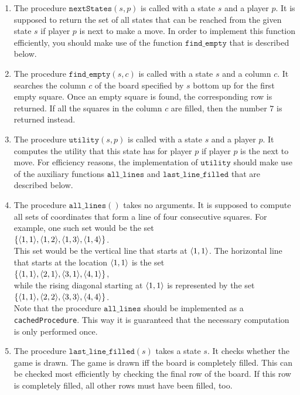 \begin{enumerate}
\item The procedure $\texttt{nextStates}(s, p)$ is called with a state $s$ and a player $p$.
      It is supposed to return the set of all states that can be reached from the given state $s$ if player $p$
      is next to make a move.  In order to implement this function efficiently, you should make use of the
      function $\texttt{find\_empty}$ that is described below.  
\item The procedure $\texttt{find\_empty}(s, c)$ is called with a state $s$ and a column $c$.  It searches the
      column $c$ of the board specified by $s$ bottom up for the first empty square.  Once an empty square is found, 
      the corresponding row is returned.  If all the squares in the column $c$ are filled, then the number $7$
      is returned instead.
\item The procedure $\texttt{utility}(s, p)$ is called with a state $s$ and a player $p$.
      It computes the utility that this state has for player $p$ if player $p$ is the next to move.
      For efficiency reasons, the implementation of $\texttt{utility}$ should make use of the auxiliary functions
      $\texttt{all\_lines}$ and $\texttt{last\_line\_filled}$ that are described below.
\item The procedure $\texttt{all\_lines}()$ takes no arguments.  It is supposed to compute all sets of coordinates that form
      a line of four consecutive squares.  For example, one such set would be the set
      \\[0.2cm]
      \hspace*{1.3cm}
      $\{ \pair(1,1), \pair(1,2), \pair(1,3), \pair(1,4) \}$.
      \\[0.2cm]
      This set would be the vertical line that starts at $\pair(1,1)$.  The horizontal line that starts at the
      location  $\pair(1,1)$ is the set
      \\[0.2cm]
      \hspace*{1.3cm}
      $\{ \pair(1,1), \pair(2,1), \pair(3,1), \pair(4,1) \}$,
      \\[0.2cm]
      while the rising diagonal starting at $\pair(1,1)$ is represented by the set
      \\[0.2cm]
      \hspace*{1.3cm}
      $\{ \pair(1,1), \pair(2,2), \pair(3,3), \pair(4,4) \}$.
      \\[0.2cm]
      Note that the procedure $\texttt{all\_lines}$ should be implemented as a \texttt{cachedProcedure}.  This
      way it is guaranteed that the necessary computation is only performed once.
\item The procedure $\texttt{last\_line\_filled}(s)$ takes a state $s$.  It checks whether the game is drawn.
      The game is drawn iff the board is completely filled.  This can be checked most efficiently by checking
      the final row of the board.  If this row is completely filled, all other rows must have  been filled, too.
\end{enumerate}
